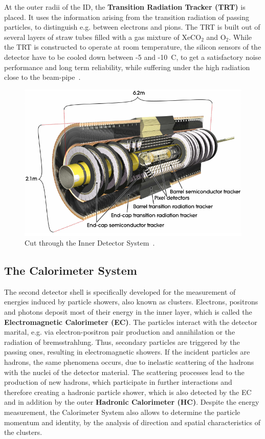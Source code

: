  At the outer radii of the ID, the \textbf{Transition Radiation Tracker (TRT)} is placed.
It uses the information arising from the transition radiation of passing particles, to distinguish e.g. between electrons and pions. The TRT is built out of several layers of straw tubes filled with a gas mixture of XeCO$_2$ and O$_2$. While the TRT is constructed to operate at room temperature, the silicon sensors of the detector have to be cooled down between -5 and -10~\textdegree C, to get a satisfactory noise performance and long term reliability, while suffering under the high radiation close to the beam-pipe~\cite{Aad:2008zzm}.     
\begin{figure}[t]
	\centering
	\includegraphics[width=0.7\linewidth]{Pics/cp3/34}
	\caption{Cut through the Inner Detector System~\cite{Aad:2008zzm}.} 
	\label{fig:34}
\end{figure}

\subsection{The Calorimeter System}\label{CD}




The second detector shell is specifically developed for the measurement of energies induced by particle showers, also known as clusters. 
Electrons, positrons and photons deposit most of their energy in the inner layer, which is called the \textbf{Electromagnetic Calorimeter (EC)}.  The particles interact with the  detector marital, e.g. via electron-positron pair production and annihilation or the radiation of bremsstrahlung. Thus, secondary particles are triggered by the passing ones, resulting in electromagnetic showers. If the incident particles are hadrons, the same phenomena occurs, due to inelastic scattering  of the hadrons with the nuclei of the detector material. The scattering processes lead to the production of new hadrons, which participate in further interactions and therefore creating a hadronic particle shower, which is also detected by the EC and in addition by the outer \textbf{Hadronic Calorimeter (HC)}. Despite the energy measurement, the Calorimeter System also allows to determine the  particle momentum and identity, by the analysis of direction and spatial characteristics of the clusters.

